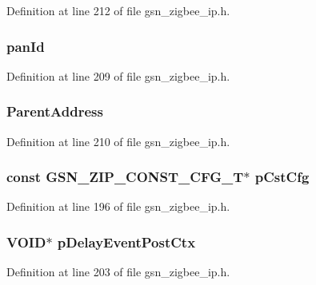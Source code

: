 Definition at line 212 of file gsn\_\-zigbee\_\-ip.h.

\hypertarget{a00440_a6581a07c1278bb253870b72dc00d386c}{
\subsubsection[{panId}]{ {\bf panId}}}
\label{a00440_a6581a07c1278bb253870b72dc00d386c}


Definition at line 209 of file gsn\_\-zigbee\_\-ip.h.

\hypertarget{a00440_ab741d6aa310525ebb0f9e4b49f320697}{
\subsubsection[{ParentAddress}]{ {\bf ParentAddress}}}
\label{a00440_ab741d6aa310525ebb0f9e4b49f320697}


Definition at line 210 of file gsn\_\-zigbee\_\-ip.h.

\hypertarget{a00440_a101a462dccde755d187c3ef31ff31a82}{
\subsubsection[{pCstCfg}]{\setlength{\rightskip}{0pt plus 5cm}const {\bf GSN\_\-ZIP\_\-CONST\_\-CFG\_\-T}$\ast$ {\bf pCstCfg}}}
\label{a00440_a101a462dccde755d187c3ef31ff31a82}


Definition at line 196 of file gsn\_\-zigbee\_\-ip.h.

\hypertarget{a00440_afcc216c129528dccc51653661a14eaef}{
\subsubsection[{pDelayEventPostCtx}]{\setlength{\rightskip}{0pt plus 5cm}VOID$\ast$ {\bf pDelayEventPostCtx}}}
\label{a00440_afcc216c129528dccc51653661a14eaef}


Definition at line 203 of file gsn\_\-zigbee\_\-ip.h.

